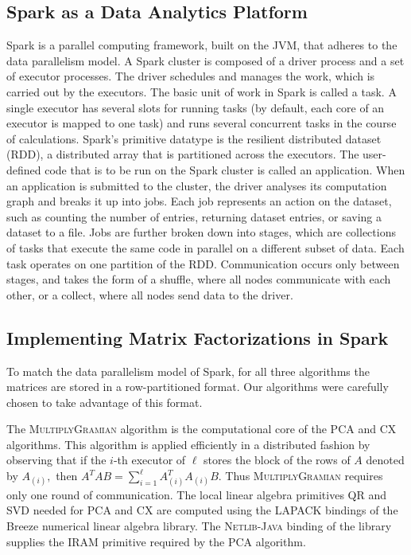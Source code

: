 
\subsection{Spark as a Data Analytics Platform} 

Spark is a parallel computing framework, built on the JVM, that adheres to the data parallelism model. A Spark cluster is composed of a driver process and a set of executor processes. The driver schedules and manages the work, which is carried out by the executors. The basic unit of work in Spark is called a task. A single executor has several slots for running tasks (by default, each core of an executor is mapped to one task) and runs several concurrent tasks in the course of calculations. Spark's primitive datatype is the resilient distributed dataset (RDD), a distributed array that is partitioned across the executors. The user-defined code that is to be run on the Spark cluster is called an application. When an application is submitted to the cluster, the driver analyses its computation graph and breaks it up into jobs.  Each job represents an action on the dataset, such as counting the number of entries, returning dataset entries, or saving a dataset to a file. Jobs are further broken down into stages, which are collections of tasks that execute the same code in parallel on a different subset of data. Each task operates on one partition of the RDD. Communication occurs only between stages, and takes the form of a shuffle, where all nodes communicate with each other, or a collect, where all nodes send data to the driver.

\subsection{Implementing Matrix Factorizations in Spark}

To match the data parallelism model of Spark, for all three algorithms the matrices are stored in a row-partitioned format.
Our algorithms were carefully chosen to take advantage of this format.  

The \textsc{MultiplyGramian} algorithm is the computational core of the PCA and CX algorithms.
This algorithm is applied efficiently in a distributed fashion by observing that if the $i$-th executor of $\ell$ stores the block of the rows of $A$ denoted by $A_{(i)},$ then $A^TA B = \sum_{i=1}^\ell A_{(i)}^T A_{(i)} B.$ Thus \textsc{MultiplyGramian} requires only one round of communication.  The local linear algebra primitives \textsc{QR} and \textsc{SVD} needed for PCA and CX are computed using the \textsc{LAPACK} bindings of the Breeze numerical linear algebra library.  The \textsc{Netlib-Java} binding of the  library supplies the \textsc{IRAM} primitive required by the PCA algorithm. 

